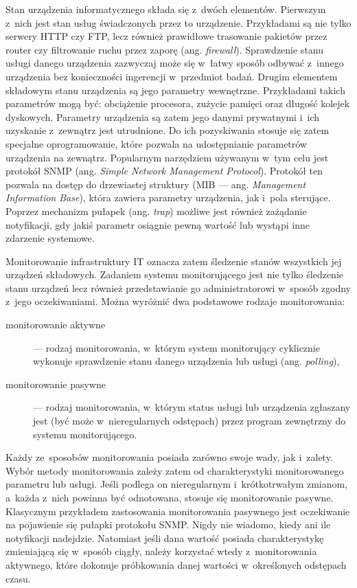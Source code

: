 Stan urządzenia informatycznego składa się z~dwóch
elementów. Pierwszym z~nich jest stan usług świadczonych przez to
urządzenie. Przykładami są nie tylko serwery HTTP czy FTP, lecz
również prawidłowe trasowanie pakietów przez router czy filtrowanie
ruchu przez zaporę (ang. {\em firewall}). Sprawdzenie stanu usługi
danego urządzenia zazwyczaj może się w~łatwy sposób odbywać z~innego
urządzenia bez konieczności ingerencji w~przedmiot badań. Drugim
elementem składowym stanu urządzenia są jego parametry
wewnętrzne. Przykładami takich parametrów mogą być: obciążenie
procesora, zużycie pamięci oraz długość kolejek dyskowych. Parametry
urządzenia są zatem jego danymi prywatnymi i~ich uzyskanie z~zewnątrz
jest utrudnione. Do ich pozyskiwania stosuje się zatem specjalne
oprogramowanie, które pozwala na udostępnianie parametrów urządzenia
na zewnątrz. Popularnym narzędziem używanym w~tym celu jest protokół
SNMP (ang. {\em Simple Network Management Protocol})\cite{www:SNMP}.
Protokół ten pozwala na dostęp do drzewiastej struktury (MIB ---
ang. {\em Management Information Base}), która zawiera parametry
urządzenia, jak i~pola sterujące. Poprzez mechanizm pułapek (ang. {\em
  trap}) możliwe jest również zażądanie notyfikacji, gdy jakiś
parametr osiągnie pewną wartość lub wystąpi inne zdarzenie systemowe.

Monitorowanie infrastruktury IT oznacza zatem śledzenie stanów
wszystkich jej urządzeń składowych. Zadaniem systemu monitorującego
jest nie tylko śledzenie stanu urządzeń lecz również przedstawianie go
administratorowi w~sposób zgodny z~jego oczekiwaniami. Można wyróżnić
dwa podstawowe rodzaje monitorowania:

\begin{description}
\item[monitorowanie aktywne] --- rodzaj monitorowania, w~którym system
  monitorujący cyklicznie wykonuje sprawdzenie stanu danego
  urządzenia lub usługi (ang. {\em polling}),
\item[monitorowanie pasywne] --- rodzaj monitorowania, w~którym status
  usługi lub urządzenia zgłaszany jest (być może w~nieregularnych
  odstępach) przez program zewnętrzny do systemu monitorującego.
\end{description}

Każdy ze~sposobów monitorowania posiada zarówno swoje wady, jak
i~zalety. Wybór metody monitorowania zależy zatem od charakterystyki
monitorowanego parametru lub usługi. Jeśli podlega on nieregularnym
i~krótkotrwałym zmianom, a~każda z~nich powinna być odnotowana,
stosuje się monitorowanie pasywne. Klasycznym przykładem zastosowania
monitorowania pasywnego jest oczekiwanie na pojawienie się pułapki
protokołu SNMP. Nigdy nie wiadomo, kiedy ani ile notyfikacji
nadejdzie. Natomiast jeśli dana wartość posiada charakterystykę
zmieniającą się w~sposób ciągły, należy korzystać wtedy
z~monitorowania aktywnego, które dokonuje próbkowania danej wartości
w~określonych odstępach czasu.

